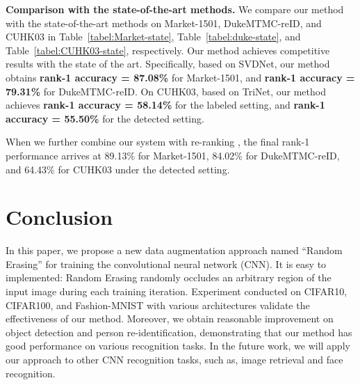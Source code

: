 \documentclass[10pt,twocolumn,letterpaper]{article}
\begin{document}
\textbf{Comparison with the state-of-the-art methods.} We compare our method with the state-of-the-art methods on Market-1501, DukeMTMC-reID, and CUHK03 in Table~\ref{tabel:Market-state}, Table~\ref{tabel:duke-state}, and Table~\ref{tabel:CUHK03-state}, respectively. Our method achieves competitive results with the state of the art. Specifically, 
 based on SVDNet, our method obtains \textbf{rank-1 accuracy = 87.08\%}  for Market-1501, and \textbf{rank-1 accuracy = 79.31\%}  for DukeMTMC-reID. On CUHK03, based on TriNet, our method achieves \textbf{rank-1 accuracy = 58.14\%} for the labeled setting, and \textbf{rank-1 accuracy = 55.50\%} for the detected setting.

When we further combine our system with re-ranking  \cite{zhong2017re,bai2016sparse}, the final rank-1 performance arrives at 89.13\% for Market-1501, 84.02\% for DukeMTMC-reID, and 64.43\% for CUHK03 under the detected setting.






\section{Conclusion}
In this paper, we propose a new data augmentation approach named ``Random Erasing'' for training the convolutional neural network (CNN). It is easy to implemented: Random Erasing randomly occludes an arbitrary region of the input image during each training iteration. Experiment conducted on CIFAR10, CIFAR100, and Fashion-MNIST with various architectures validate the effectiveness of our method. Moreover, we obtain reasonable improvement on object detection and person re-identification, demonstrating that our method has good performance on various recognition tasks. In the future work, we will apply our approach to other CNN recognition tasks, such as, image retrieval and face recognition.

{\small


}
\end{document}
